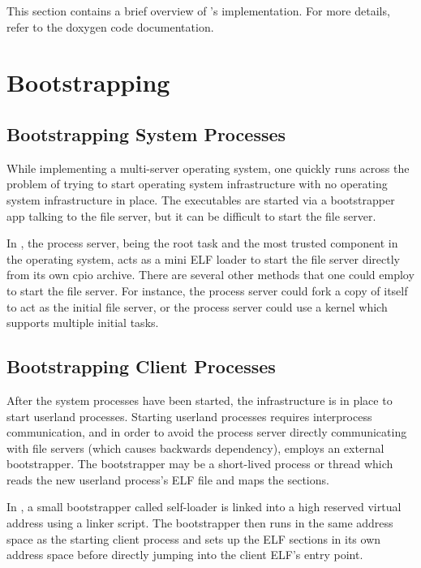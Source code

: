 %
%
%

This section contains a brief overview of 's implementation. For more details, refer to the doxygen code documentation.

\section{Bootstrapping}

\subsection*{Bootstrapping System Processes}
While implementing a multi-server operating system, one quickly runs across the problem of trying to start operating system infrastructure with no operating system infrastructure in place. The executables are started via a bootstrapper app talking to the file server, but it can be difficult to start the file server.

In , the process server, being the root task and the most trusted component in the operating system, acts as a mini ELF loader to start the file server directly from its own cpio archive. There are several other methods that one could employ to start the file server. For instance, the process server could fork a copy of itself to act as the initial file server, or the process server could use a kernel which supports multiple initial tasks.

\subsection*{Bootstrapping Client Processes}
After the system processes have been started, the infrastructure is in place to start userland processes. Starting userland processes requires interprocess communication, and in order to avoid the process server directly communicating with file servers (which causes backwards dependency),  employs an external bootstrapper. The bootstrapper may be a short-lived process or thread which reads the new userland process's ELF file and maps the sections.

In , a small bootstrapper called self-loader is linked into a high reserved virtual address using a linker script. The bootstrapper then runs in the same address space as the starting client process and sets up the ELF sections in its own address space before directly jumping into the client ELF's entry point.


